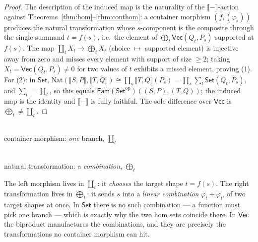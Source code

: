 \documentclass[11pt]{amsart}
\theoremstyle{plain}
\theoremstyle{definition}
\renewcommand{\Vec}{\mathsf{Vec}}
\newcommand{\Set}{\mathsf{Set}}
\newcommand{\Fam}{\mathsf{Fam}}
\newcommand{\op}{\mathrm{op}}
\newcommand{\Nat}{\mathrm{Nat}}
\newcommand{\ext}[1]{\llbracket #1 \rrbracket}
\newcommand{\bul}{{-}}
\newcommand{\iso}{\cong}
\DeclareMathOperator{\dcoprod}{\textstyle\coprod}
\begin{document}
\begin{proof}
The description of the induced map is the naturality of the
$\ext{\bul}$-action against Theorems~\ref{thm:hom}--\ref{thm:conthom}: a
container morphism $(f,(\varphi_s))$ produces the natural transformation whose
$s$-component is the composite through the single summand $t=f(s)$, i.e.\ the
element of $\bigoplus_t\Vec(Q_t,P_s)$ supported at $f(s)$. The map
$\dcoprod_t X_t\to\bigoplus_t X_t$ (choice $\mapsto$ supported element) is
injective away from zero and misses every element with support of size $\ge 2$;
taking $X_t=\Vec(Q_t,P_s)\neq 0$ for two values of $t$ exhibits a missed
element, proving (1). For (2): in $\Set$,
$\Nat(\ext{S,P},\ext{T,Q})\iso\prod_s\ext{T,Q}(P_s)=\prod_s\sum_t\Set(Q_t,P_s)$,
and $\sum_t=\dcoprod_t$, so this equals $\Fam(\Set^\op)((S,P),(T,Q))$; the
induced map is the identity and $\ext{\bul}$ is fully faithful. The sole
difference over $\Vec$ is $\bigoplus_t\neq\dcoprod_t$.
\end{proof}

\begin{center}
\begin{minipage}{0.45\linewidth}\centering
{}\\[2pt]
{\small container morphism: \emph{one} branch, $\dcoprod_t$}
\end{minipage}%
\hfill
\begin{minipage}{0.45\linewidth}\centering
{}\\[2pt]
{\small natural transformation: a \emph{combination}, $\bigoplus_t$}
\end{minipage}
\end{center}
\noindent The left morphism lives in $\dcoprod_t$: it \emph{chooses} the
target shape $t=f(s)$. The right transformation lives in $\bigoplus_t$: it
sends $s$ into a \emph{linear combination} $\varphi_t+\varphi_{t'}$ of two
target shapes at once. In $\Set$ there is no such combination --- a function
must pick one branch --- which is exactly why the two hom sets coincide there.
In $\Vec$ the biproduct manufactures the combinations, and they are precisely
the transformations no container morphism can hit.
\end{document}
